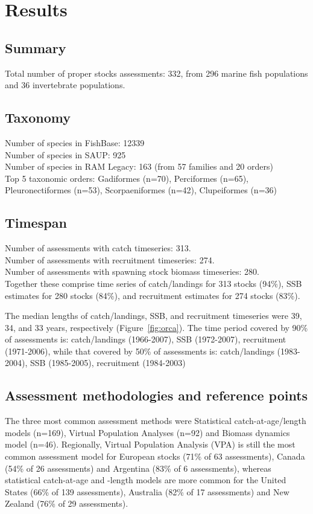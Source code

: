 \section*{Results}
\subsection*{Summary}
\noindent
Total number of proper stocks assessments: 332, from 296 marine fish populations and 36
invertebrate populations.

\subsection*{Taxonomy}
\noindent

Number of species in FishBase: 12339\\
Number of species in SAUP: 925\\
Number of species in RAM Legacy: 163 (from 57 families and 20 orders) \\
Top 5 taxonomic orders: Gadiformes (n=70), Perciformes (n=65), Pleuronectiformes (n=53), Scorpaeniformes (n=42), Clupeiformes (n=36) \\

\subsection*{Timespan}
\noindent
Number of assessments with catch timeseries: 313.\\
Number of assessments with recruitment timeseries: 274.\\
Number of assessments with spawning stock biomass timeseries: 280.\\

Together these comprise time series of
catch/landings for 313 stocks (94\%),
SSB estimates for 280 stocks (84\%), and recruitment estimates for
274 stocks (83\%).

The median lengths of catch/landings, SSB, and recruitment timeseries
were 39, 34, and 33
years, respectively (Figure~\ref{fig:orca}).  The time period covered by 90\% of assessments
is: catch/landings (1966-2007), SSB
(1972-2007), recruitment (1971-2006), while that
covered by 50\% of assessments is: catch/landings
(1983-2004), SSB (1985-2005), recruitment
(1984-2003)
 
\subsection*{Assessment methodologies and reference points}
\noindent
The three most common assessment methods were
Statistical catch-at-age/length models (n=169), Virtual Population Analyses (n=92) and
Biomass dynamics model (n=46). Regionally, Virtual Population Analysis
(VPA) is still the most common assessment model for European stocks
(71\% of 63 assessments),
Canada (54\% of 26
assessments) and Argentina (83\% of
6 assessments), whereas statistical catch-at-age
and -length models are more common for the United States
(66\% of 139 assessments),
Australia (82\% of 17
assessments) and New Zealand (76\% of
29 assessments).

